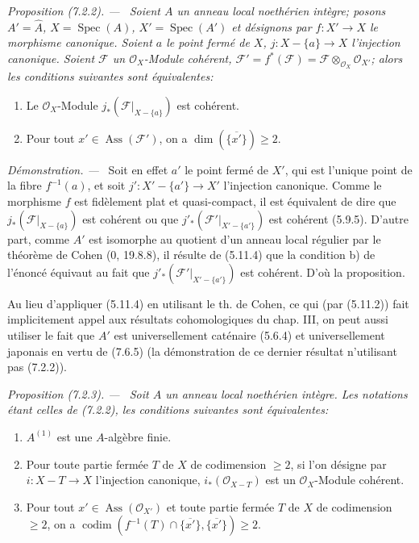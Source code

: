\documentclass[10pt,oneside]{book}
\newenvironment{proposition}[1][]{%
  \par\medskip\noindent\itshape Proposition (#1). ---\ }{\par}
\newenvironment{proof}{%
  \par\medskip\noindent\textit{Démonstration. ---\ }}{\par}
\begin{document}
\begin{proposition}[7.2.2]
\label{IV.2.s7.2.2-fr}
Soient $A$ un anneau local noethérien intègre; posons $A'=\widehat A$,
$X=\operatorname{Spec}(A)$, $X'=\operatorname{Spec}(A')$ et désignons par
$f:X'\to X$ le morphisme canonique. Soient $a$ le point fermé de $X$,
$j:X-\{a\}\to X$ l'injection canonique. Soient $\mathscr F$ un
$\mathscr O_X$-Module cohérent,
$\mathscr F'=f^*(\mathscr F)=\mathscr F\otimes_{\mathscr O_X}\mathscr O_{X'}$;
alors les conditions suivantes sont équivalentes:
\begin{enumerate}
\item[a)] Le $\mathscr O_X$-Module
$j_*(\mathscr F|_{X-\{a\}})$ est cohérent.
\item[b)] Pour tout $x'\in\operatorname{Ass}(\mathscr F')$, on a
$\dim(\overline{\{x'\}})\geqslant2$.
\end{enumerate}
\end{proposition}

\begin{proof}
Soit en effet $a'$ le point fermé de $X'$, qui est l'unique point de la
fibre $f^{-1}(a)$, et soit $j':X'-\{a'\}\to X'$ l'injection canonique.
Comme le morphisme $f$ est fidèlement plat et quasi-compact, il est
équivalent de dire que $j_*(\mathscr F|_{X-\{a\}})$ est cohérent ou que
$j'_*(\mathscr F'|_{X'-\{a'\}})$ est cohérent (5.9.5). D'autre part, comme
$A'$ est isomorphe au quotient d'un anneau local régulier par le théorème de
Cohen (0, 19.8.8), il résulte de (5.11.4) que la condition b) de l'énoncé
équivaut au fait que $j'_*(\mathscr F'|_{X'-\{a'\}})$ est cohérent. D'où la
proposition.

Au lieu d'appliquer (5.11.4) en utilisant le th. de Cohen, ce qui (par
(5.11.2)) fait implicitement appel aux résultats cohomologiques du chap.
III, on peut aussi utiliser le fait que $A'$ est universellement caténaire
(5.6.4) et universellement japonais en vertu de (7.6.5) (la démonstration de
ce dernier résultat n'utilisant pas (7.2.2)).
\end{proof}

\begin{proposition}[7.2.3]
\label{IV.2.s7.2.3-fr}
Soit $A$ un anneau local noethérien intègre. Les notations étant celles de
(7.2.2), les conditions suivantes sont équivalentes:
\begin{enumerate}
\item[a)] $A^{(1)}$ est une $A$-algèbre finie.
\item[b)] Pour toute partie fermée $T$ de $X$ de codimension $\geqslant2$,
si l'on désigne par $i:X-T\to X$ l'injection canonique,
$i_*(\mathscr O_{X-T})$ est un $\mathscr O_X$-Module cohérent.
\item[c)] Pour tout $x'\in\operatorname{Ass}(\mathscr O_{X'})$ et toute
partie fermée $T$ de $X$ de codimension $\geqslant2$, on a
$\operatorname{codim}(f^{-1}(T)\cap\overline{\{x'\}},
\overline{\{x'\}})\geqslant2$.
\end{enumerate}
\end{proposition}
\end{document}
